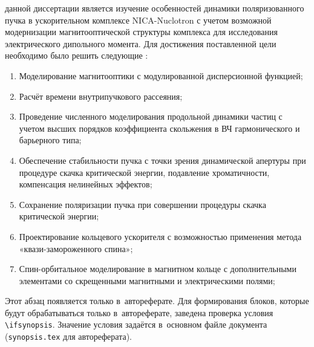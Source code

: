 
{\actuality} 
{\aim} данной диссертации является изучение 
особенностей динамики поляризованного пучка в ускорительном 
комплексе NICA-Nuclotron с учетом возможной модернизации 
магнитооптической структуры комплекса для исследования 
электрического дипольного момента.
Для достижения поставленной цели необходимо было 
решить следующие {\tasks}:

\begin{enumerate}[beginpenalty=10000] %
  \item Моделирование магнитооптики с модулированной дисперсионной функцией;
  \item Расчёт времени внутрипучкового рассеяния;
  \item Проведение численного моделирования продольной динамики частиц с учетом высших порядков коэффициента скольжения в ВЧ гармонического и барьерного типа;
  \item Обеспечение стабильности пучка с точки зрения динамической апертуры при процедуре скачка критической энергии, подавление хроматичности, компенсация нелинейных эффектов;
  \item Сохранение поляризации пучка при совершении процедуры скачка критической энергии;
  \item Проектирование кольцевого ускорителя с возможностью применения метода «квази-замороженного спина»;
  \item Спин-орбитальное моделирование в магнитном кольце с дополнительными элементами со скрещенными магнитными и электрическими полями; 
\end{enumerate}

\ifsynopsis
Этот абзац появляется только в~автореферате.
Для формирования блоков, которые будут обрабатываться только в~автореферате,
заведена проверка условия \verb!\!\verb!ifsynopsis!.
Значение условия задаётся в~основном файле документа (\verb!synopsis.tex! для
автореферата).
\else
\fi


